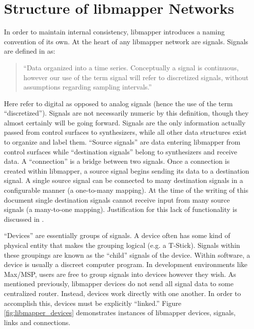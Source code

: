 	\section{Structure of libmapper Networks} %
	\label{sec:structure_of_libmapper_networks}

In order to maintain internal consistency, libmapper introduces a naming convention of its own. At the heart of any libmapper network are signals. Signals are defined in  as:
\begin{quote}
``Data organized into a time series. Conceptually a signal is continuous, however our use of the term signal will refer to discretized signals, without assumptions regarding sampling intervals.''
\end{quote}
Here  refer to digital as opposed to analog signals (hence the use of the term ``discretized''). Signals are not necessarily numeric by this definition, though they almost certainly will be going forward. Signals are the only information actually passed from control surfaces to synthesizers, while all other data structures exist to organize and label them. ``Source signals'' are data entering libmapper from control surfaces while ``destination signals'' belong to synthesizers and receive data. A ``connection'' is a bridge between two signals. Once a connection is created within libmapper, a source signal begins sending its data to a destination signal. A single source signal can be connected to many destination signals in a configurable manner (a one-to-many mapping). At the time of the writing of this document single destination signals cannot receive input from many source signals (a many-to-one mapping). Justification for this lack of functionality is discussed in .

``Devices'' are essentially groups of signals. A device often has some kind of physical entity that makes the grouping logical (e.g. a T-Stick). Signals within these groupings are known as the ``child'' signals of the device. Within software, a device is usually a discreet computer program. In development environments like Max/MSP, users are free to group signals into devices however they wish. As mentioned previously, libmapper devices do not send all signal data to some centralized router. Instead, devices work directly with one another. In order to accomplish this, devices must be explicitly ``linked.'' Figure \ref{fig:libmapper_devices} demonstrates instances of libmapper devices, signals, links and connections.
 
